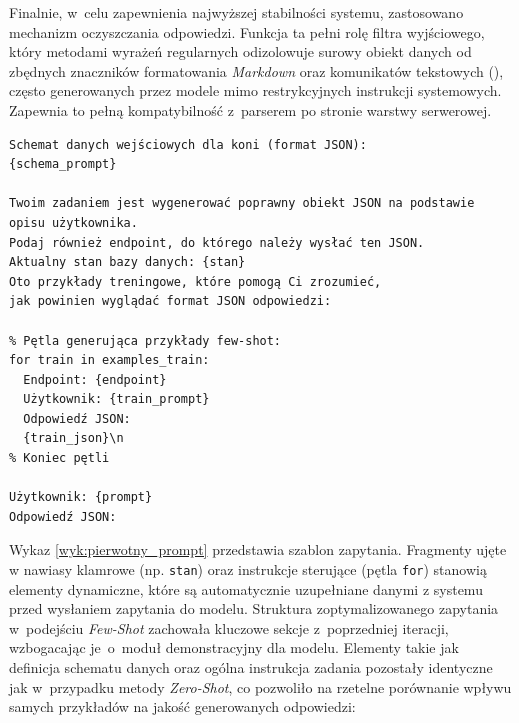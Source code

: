 Finalnie, w~celu zapewnienia najwyższej stabilności systemu, zastosowano mechanizm oczyszczania odpowiedzi. Funkcja ta pełni rolę filtra wyjściowego, który metodami wyrażeń regularnych odizolowuje surowy obiekt danych od zbędnych znaczników formatowania \textit{Markdown} oraz komunikatów tekstowych (), często generowanych przez modele  mimo restrykcyjnych instrukcji systemowych. Zapewnia to pełną kompatybilność z~parserem po stronie warstwy serwerowej.

\begin{wykaz}[ht]
    \centering
    \begin{tcolorbox}[colback=gray!5, colframe=gray!50, arc=0mm, boxrule=0.5pt]
        \begin{verbatim}
Schemat danych wejściowych dla koni (format JSON):
{schema_prompt}

Twoim zadaniem jest wygenerować poprawny obiekt JSON na podstawie
opisu użytkownika. 
Podaj również endpoint, do którego należy wysłać ten JSON.
Aktualny stan bazy danych: {stan}
Oto przykłady treningowe, które pomogą Ci zrozumieć,
jak powinien wyglądać format JSON odpowiedzi:

% Pętla generująca przykłady few-shot:
for train in examples_train:
  Endpoint: {endpoint}
  Użytkownik: {train_prompt}
  Odpowiedź JSON:
  {train_json}\n
% Koniec pętli

Użytkownik: {prompt}
Odpowiedź JSON:
        \end{verbatim}
    \end{tcolorbox}
    \caption{Struktura zapytania zawierająca pełny schemat bazy danych i przykłady uczące.}
    \label{wyk:pierwotny_prompt}
\end{wykaz}

Wykaz \ref{wyk:pierwotny_prompt} przedstawia szablon zapytania. Fragmenty ujęte w nawiasy klamrowe (np. \texttt{{stan}}) oraz instrukcje sterujące (pętla \texttt{for}) stanowią elementy dynamiczne, które są automatycznie uzupełniane danymi z systemu przed wysłaniem zapytania do modelu.
Struktura zoptymalizowanego zapytania w~podejściu \textit{Few-Shot} zachowała kluczowe sekcje z~poprzedniej iteracji, wzbogacając je~o~moduł demonstracyjny dla modelu. Elementy takie jak definicja schematu danych oraz ogólna instrukcja zadania pozostały identyczne jak w~przypadku metody \textit{Zero-Shot}, co pozwoliło na rzetelne porównanie wpływu samych przykładów na jakość generowanych odpowiedzi:

